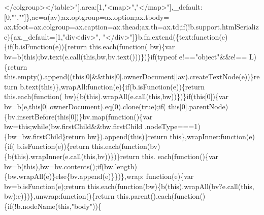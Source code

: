 \begin{DoxyCode}
{      </colgroup></table>"}],area:[1,\textcolor{stringliteral}{"<map>"},\textcolor{stringliteral}{"</map>"}],\_default:[0,\textcolor{stringliteral}{""},\textcolor{stringliteral}{""}]\},ac=a(av);ax.optgroup=ax.option;ax.tbody=
      ax.tfoot=ax.colgroup=ax.caption=ax.thead;ax.th=ax.td;\textcolor{keywordflow}{if}(!b.support.htmlSerialize)\{ax.\_default=[1,\textcolor{stringliteral}{"div<div>"},\textcolor{stringliteral}{
      "</div>"}]\}b.fn.extend(\{text:\textcolor{keyword}{function}(e)\{\textcolor{keywordflow}{if}(b.isFunction(e))\{\textcolor{keywordflow}{return} this.each(\textcolor{keyword}{function}(
      bw)\{var bv=b(\textcolor{keyword}{this});bv.text(e.call(\textcolor{keyword}{this},bw,bv.text()))\})\}\textcolor{keywordflow}{if}(typeof e!==\textcolor{stringliteral}{"object"}&&e!==
      L)\{\textcolor{keywordflow}{return} this.empty().append((\textcolor{keyword}{this}[0]&&\textcolor{keyword}{this}[0].ownerDocument||av).createTextNode(e))\}\textcolor{keywordflow}{return} 
      b.text(\textcolor{keyword}{this})\},wrapAll:\textcolor{keyword}{function}(e)\{\textcolor{keywordflow}{if}(b.isFunction(e))\{\textcolor{keywordflow}{return} this.each(\textcolor{keyword}{function}(
      bw)\{b(\textcolor{keyword}{this}).wrapAll(e.call(\textcolor{keyword}{this},bw))\})\}\textcolor{keywordflow}{if}(\textcolor{keyword}{this}[0])\{var bv=b(e,\textcolor{keyword}{this}[0].ownerDocument).eq(0).clone(\textcolor{keyword}{true});\textcolor{keywordflow}{if}(\textcolor{keyword}{
      this}[0].parentNode)\{bv.insertBefore(\textcolor{keyword}{this}[0])\}bv.map(\textcolor{keyword}{function}()\{var bw=\textcolor{keyword}{this};\textcolor{keywordflow}{while}(bw.firstChild&&bw.firstChild
      .nodeType===1)\{bw=bw.firstChild\}\textcolor{keywordflow}{return} bw\}).append(\textcolor{keyword}{this})\}\textcolor{keywordflow}{return} \textcolor{keyword}{this}\},wrapInner:\textcolor{keyword}{function}(e)\{\textcolor{keywordflow}{if}(
      b.isFunction(e))\{\textcolor{keywordflow}{return} this.each(\textcolor{keyword}{function}(bv)\{b(\textcolor{keyword}{this}).wrapInner(e.call(\textcolor{keyword}{this},bv))\})\}\textcolor{keywordflow}{return} this.
      each(\textcolor{keyword}{function}()\{var bv=b(\textcolor{keyword}{this}),bw=bv.contents();\textcolor{keywordflow}{if}(bw.length)\{bw.wrapAll(e)\}\textcolor{keywordflow}{else}\{bv.append(e)\}\})\},wrap:\textcolor{keyword}{
      function}(e)\{var bv=b.isFunction(e);\textcolor{keywordflow}{return} this.each(\textcolor{keyword}{function}(bw)\{b(\textcolor{keyword}{this}).wrapAll(bv?e.call(\textcolor{keyword}{this},
      bw):e)\})\},unwrap:\textcolor{keyword}{function}()\{\textcolor{keywordflow}{return} this.parent().each(\textcolor{keyword}{function}()\{\textcolor{keywordflow}{if}(!b.nodeName(\textcolor{keyword}{this},\textcolor{stringliteral}{"body"}))\{

\end{DoxyCode}
